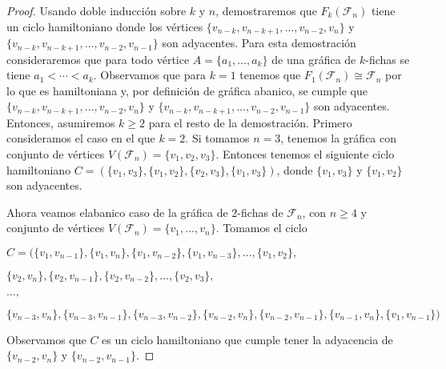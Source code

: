         
        \begin{proof}
            Usando doble inducci\'on sobre $k$ y $n$, demostraremos que
            $F_k(\mathcal{F}_n)$ tiene un ciclo hamiltoniano donde los v\'ertices
            $\{v_{n-k}, v_{n-k+1}, \dots, v_{n-2}, v_n\}$ y $\{v_{n-k},
            v_{n-k+1}, \dots, v_{n-2}, v_{n-1}\}$ son adyacentes. Para esta
            demostraci\'on consideraremos que para todo v\'ertice $A = \{a_1,
            \dots, a_k\}$ de una gr\'afica de $k$-fichas se tiene $a_1 < \cdots
            < a_k$. Observamos que para $k =1$ tenemos que $F_1(\mathcal{F}_n) \cong \mathcal{F}_n$
            por lo que es hamiltoniana y, por definici\'on de gr\'afica abanico,
            se cumple que $\{v_{n-k}, v_{n-k+1}, \dots, v_{n-2}, v_n\}$ y
            $\{v_{n-k}, v_{n-k+1}, \dots, v_{n-2}, v_{n-1}\}$ son adyacentes.
            Entonces, asumiremos $k \geq 2$ para el resto de la demostraci\'on.
            Primero consideramos el caso en el que $k =2$. Si tomamos $n = 3$,
            tenemos la gr\'afica con conjunto de v\'ertices $V(\mathcal{F}_n)=\{v_1, v_2,
            v_3\}$. Entonces tenemos el siguiente ciclo hamiltoniano $C=
            (\{v_1,v_3\},\{v_1,v_2\},\{v_2,v_3\}, \{v_1,v_3\})$, donde $\{v_1,
            v_3\}$ y $\{v_1, v_2\}$ son adyacentes. 
            
            Ahora veamos elabanico caso de la gr\'afica de $2$-fichas de $\mathcal{F}_n$, con $n
            \geq 4$ y conjunto de v\'ertices $V(\mathcal{F}_n)=\{v_1,\dots, v_n\}$.
            Tomamos el ciclo
    
            $C = (\{v_1, v_{n-1}\},\{v_1, v_n\},\{v_1, v_{n-2}\}, \{v_1,
            v_{n-3}\}, \dots, \{v_1, v_2\},$
            
            $\{v_2, v_n\}, \{v_2, v_{n-1}\}, \{v_2, v_{n-2}\},
            \dots, \{v_2, v_3\},$
    
            $ \dots,$
    
            $\{v_{n-3},v_n\}, \{v_{n-3}, v_{n-1}\},\{v_{n-3},v_{n-2}\},
            \{v_{n-2}, v_n\},\{v_{n-2}, v_{n-1}\}, \{v_{n-1}, v_n\}, \{v_1,
            v_{n-1}\})$
    
            Observamos que $C$ es un ciclo hamiltoniano que cumple tener la
            adyacencia de  $\{v_{n-2}, v_n\}$ y $\{v_{n-2}, v_{n-1}\}$. 
    

\end{proof}
